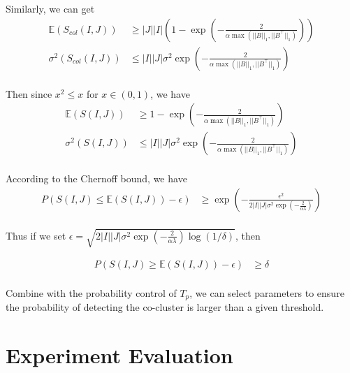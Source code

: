\documentclass[journal]{IEEEtran}
\begin{document}
Similarly, we can get
\begin{align*}
  \mathbb{E}(S_{col}(I,J)) & \ge |J||I| \left(1 - \exp(-\frac{2}{\alpha \max(||B||_1, ||B^\top||_1)}) \right) \\
  \sigma^2(S_{col}(I,J))   & \le |I||J| \sigma^2 \exp(-\frac{2}{\alpha \max(||B||_1, ||B^\top||_1)})          \\
\end{align*}

Then since $x^2 \le x$ for $x \in (0,1)$, we have
\begin{align*}
  \mathbb{E}(S(I,J)) & \ge 1 - \exp(-\frac{2}{\alpha \max(||B||_1, ||B^\top||_1)})             \\
  \sigma^2(S(I,J))   & \le |I||J| \sigma^2 \exp(-\frac{2}{\alpha \max(||B||_1, ||B^\top||_1)}) \\
\end{align*}

According to the Chernoff bound, we have
\begin{align*}
  P(S(I,J) \le \mathbb{E}(S(I,J)) - \epsilon)
   & \ge \exp(-\frac{\epsilon^2}{2|I||J| \sigma^2 \exp(-\frac{2}{\alpha \lambda})}) \\
\end{align*}

Thus if we set $\epsilon = \sqrt{2|I||J| \sigma^2 \exp(-\frac{2}{\alpha \lambda}) \log(1/\delta)}$, then

\begin{align*}
  P(S(I,J) \ge \mathbb{E}(S(I,J)) - \epsilon) & \ge \delta \\
\end{align*}

Combine with the probability control of $T_p$, we can select parameters to ensure the probability of detecting the co-cluster is larger than a given threshold.

\section{Experiment Evaluation}
\label{sec:experiment}
\end{document}
